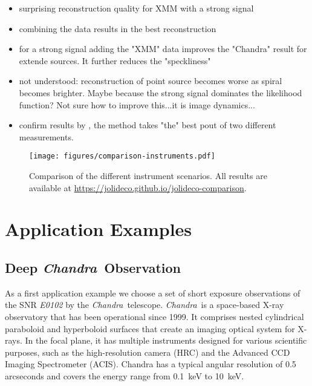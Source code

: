 \documentclass[twocolumn]{aastex631}
\newcommand{\chandra}{\textit{Chandra}~}
\begin{document}
    \begin{itemize}
        \item surprising reconstruction quality for XMM with a strong signal
        \item combining the data results in the best reconstruction
        \item for a strong signal adding the "XMM" data improves the "Chandra" result for extende sources. It further reduces the "speckliness"
        \item not understood: reconstruction of point source becomes worse as spiral becomes brighter. Maybe because the strong signal dominates the likelihood function? Not sure how to improve this...it is image dynamics...
        \item confirm results by \cite{Ingaramo2014}, the method takes "the" best pout of two different measurements. 
    \end{itemize}
    
    \begin{figure*}
        \begin{centering}
            \texttt{[image: figures/comparison-instruments.pdf]}
            \caption{
                Comparison of the different instrument scenarios. 
                All results are available at \url{https://jolideco.github.io/jolideco-comparison}.
            }
            \label{fig:comparison-instruments}
        \end{centering}
    \end{figure*}

    \section{Application Examples}
    \subsection{Deep \chandra Observation}
    As a first application example we choose a set of short exposure observations of the SNR \textit{E0102} by the \chandra telescope. \chandra is a space-based X-ray observatory that has been operational since 1999. It comprises nested cylindrical paraboloid and hyperboloid surfaces that create an imaging optical system for X-rays. In the focal plane, it has multiple instruments designed for various scientific purposes, such as the high-resolution camera (HRC) and the Advanced CCD Imaging Spectrometer (ACIS). Chandra has a typical angular resolution of 0.5 arcseconds and covers the energy range from \qty[mode = text]{0.1}{keV} to  \qty[mode = text]{10}{keV}. 
    
\end{document}
